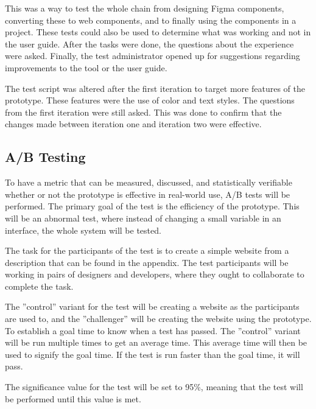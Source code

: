 This was a way to test the whole chain from designing Figma components, converting these to web components, and to finally using the components in a project. These tests could also be used to determine what was working and not in the user guide. After the tasks were done, the questions about the experience were asked. Finally, the test administrator opened up for suggestions regarding improvements to the tool or the user guide. 

The test script was altered after the first iteration to target more features of the prototype. These features were the use of color and text styles. The questions from the first iteration were still asked. This was done to confirm that the changes made between iteration one and iteration two were effective. 


\subsection{ A/B Testing }%
\label{sub:ab-testing}
To have a metric that can be measured, discussed, and statistically verifiable whether or not the prototype is effective in real-world use, A/B tests will be performed.  The primary goal of the test is the efficiency of the prototype. This will be an abnormal test, where instead of changing a small variable in an interface, the whole system will be tested. 

The task for the participants of the test is to create a simple website from a description that can be found in the appendix. The test participants will be working in pairs of designers and developers, where they ought to collaborate to complete the task. 

The ''control'' variant for the test will be creating a website as the participants are used to, and the ''challenger'' will be creating the website using the prototype. To establish a goal time to know when a test has passed. The ''control'' variant will be run multiple times to get an average time. This average time will then be used to signify the goal time. If the test is run faster than the goal time, it will pass. 

The significance value for the test will be set to 95\%, meaning that the test will be performed until this value is met. 


